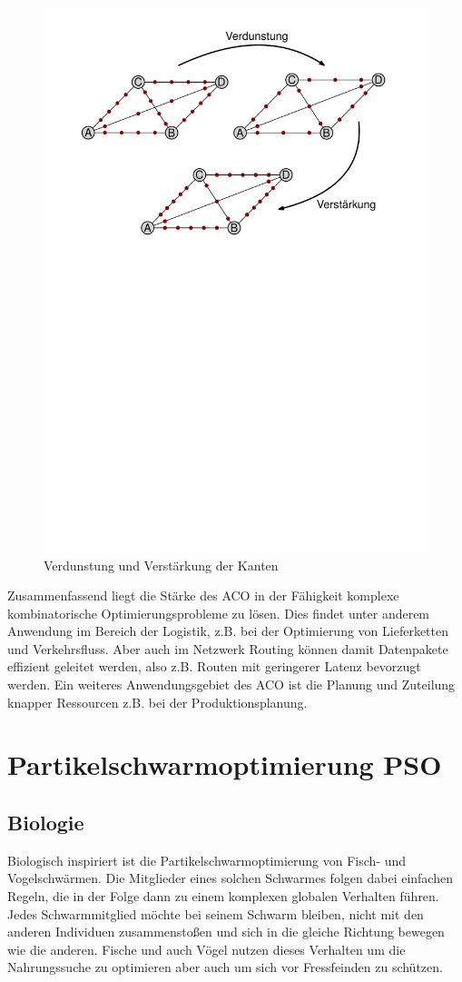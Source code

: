 \documentclass[pdftex,
               12pt,
               DIV=12,
               a4paper,
               twoside,
               parskip=half,
               abstract=true,
               dvipsnames]{scrartcl}
\begin{document}
\begin{figure}[ht]
	\begin{center}
		\includegraphics[width=0.8\linewidth]{aco_update}
		\caption{Verdunstung und Verst\"arkung der Kanten} \label{fig:ACO_aktualisierung}
	\end{center}
\end{figure}

Zusammenfassend liegt die St\"arke des ACO in der F\"ahigkeit komplexe kombinatorische Optimierungsprobleme zu l\"osen. Dies findet unter anderem Anwendung im Bereich der Logistik, z.B. bei der Optimierung von Lieferketten und Verkehrsfluss. Aber auch im Netzwerk Routing k\"onnen damit Datenpakete effizient geleitet werden, also z.B. Routen mit geringerer Latenz bevorzugt werden. Ein weiteres Anwendungsgebiet des ACO ist die Planung und Zuteilung knapper Ressourcen z.B. bei der Produktionsplanung. \cite[vgl.][]{DorigoStuetzle04}


\section{Partikelschwarmoptimierung PSO}
\subsection{Biologie}
Biologisch inspiriert ist die Partikelschwarmoptimierung von Fisch- und Vogelschw\"armen. Die Mitglieder eines solchen Schwarmes folgen dabei einfachen Regeln, die in der Folge dann zu einem komplexen globalen Verhalten f\"uhren. Jedes Schwarmmitglied m\"ochte bei seinem Schwarm bleiben, nicht mit den anderen Individuen zusammensto\ss en und sich in die gleiche Richtung bewegen wie die anderen. Fische und auch V\"ogel nutzen dieses Verhalten um die Nahrungssuche zu optimieren aber auch um sich vor Fressfeinden zu sch\"utzen. \cite[vgl.][]{KennedyEberhart01}
\end{document}
